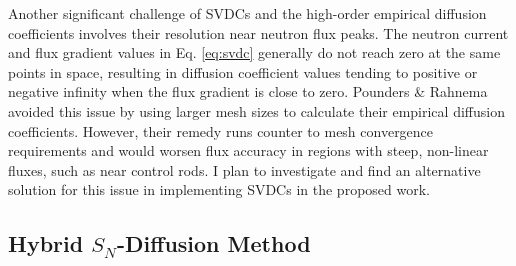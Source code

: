 Another significant challenge of \glspl{SVDC} and the high-order empirical diffusion coefficients
involves their resolution near neutron flux peaks. The neutron current and flux gradient values in
Eq. \ref{eq:svdc} generally do not reach zero at the same points in space,
resulting in diffusion coefficient values tending to positive or negative infinity when the
flux gradient is close to zero. Pounders \& Rahnema avoided this issue by using
larger mesh sizes to calculate their empirical diffusion coefficients. However, their
remedy runs counter to mesh convergence requirements and would worsen flux accuracy in regions with
steep, non-linear fluxes, such as near control rods. I plan to investigate and find an alternative
solution for this issue in implementing \glspl{SVDC} in the proposed work.

\subsection{Hybrid $S_N$-Diffusion Method} \label{sec:hybrid-method}

